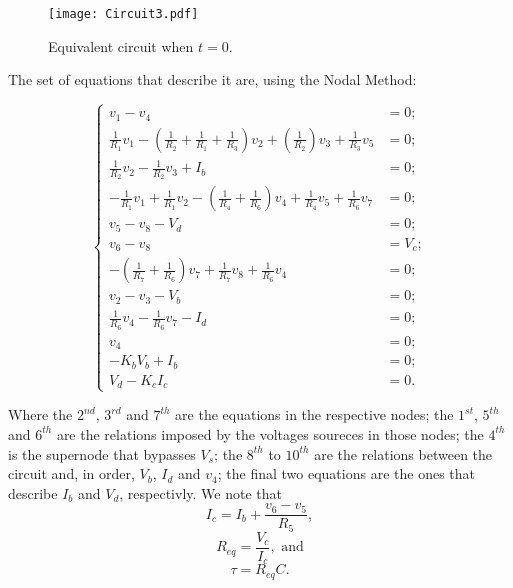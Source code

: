 \begin{figure}[h] \centering
\texttt{[image: Circuit3.pdf]}
\caption{Equivalent circuit when $t=0$.}
\label{fig:Circuit_Passo2}
\end{figure}

The set of equations that describe it are, using the Nodal Method:

\begin{equation}
\begin{cases}
	v_1 - v_4 &= 0;																				  	  \\
	\frac{1}{R_1}v_1 - (\frac{1}{R_2}+\frac{1}{R_1}+\frac{1}{R_3})v_2 + (\frac{1}{R_2})v_3 + \frac{1}{R_3}v_5 &= 0; \\
  	\frac{1}{R_2}v_2 - \frac{1}{R_2}v_3+ I_b &= 0;													  \\
  	-\frac{1}{R_1}v_1 + \frac{1}{R_1}v_2 - (\frac{1}{R_4}+\frac{1}{R_6})v_4 + \frac{1}{R_4}v_5 + \frac{1}{R_6}v_7 &= 0;			  																	  \\
	v_5 - v_8 - V_d &= 0;																			  \\
  	v_6 - v_8  &= V_c;											  	  							  \\
  	-(\frac{1}{R_7}+\frac{1}{R_6})v_7 + \frac{1}{R_7}v_8 + \frac{1}{R_6}v_4 &= 0;					  \\
	v_2 - v_3 - V_b &= 0;																			  \\
  	\frac{1}{R_6}v_4 - \frac{1}{R_6}v_7 - I_d &= 0;													  \\
  	v_4 &= 0;																						  \\
  	-K_bV_b + I_b &= 0;																				  \\
  	V_d - K_cI_c &= 0.
\end{cases}
\end{equation}

Where the $2^{nd}$, $3^{rd}$ and $7^{th}$ are the equations in the respective nodes; the $1^{st}$, $5^{th}$ and $6^{th}$ are the relations imposed by the voltages soureces in those nodes; the $4^{th}$ is the supernode that bypasses $V_s$; the $8^{th}$ to $10^{th}$ are the relations between the circuit and, in order, $V_b$, $I_d$ and $v_4$; the final two equations are the ones that describe $I_b$ and $V_d$, respectivly. 
We note that 
\begin{equation}
	I_c = I_b + \frac{v_6-v_5}{R_5},
\end{equation}
\begin{equation}
	R_{eq} = \frac{V_c}{I_c}, \text{ and}
\end{equation}
\begin{equation}
	\tau = R_{eq}C.
\end{equation}


